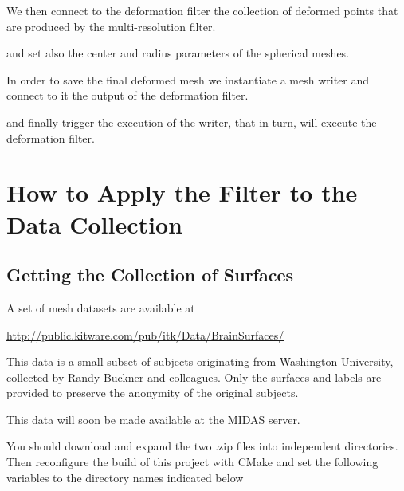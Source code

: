 \documentclass{InsightArticle}
\begin{document}
We then connect to the deformation filter the collection of deformed points that
are produced by the multi-resolution filter.

\begin{center}

\end{center}

and set also the center and radius parameters of the spherical meshes.

\begin{center}

\end{center}


In order to save the final deformed mesh we instantiate a mesh writer and
connect to it the output of the deformation filter.

\begin{center}

\end{center}

and finally trigger the execution of the writer, that in turn, will execute the
deformation filter.

\begin{center}

\end{center}


\section{How to Apply the Filter to the Data Collection}

\subsection{Getting the Collection of Surfaces}

A set of mesh datasets are available at

\url{http://public.kitware.com/pub/itk/Data/BrainSurfaces/}

This data is a small subset of subjects originating from Washington University,
collected by Randy Buckner and colleagues. Only the surfaces and labels are
provided to preserve the anonymity of the original subjects.

This data will soon be made available at the MIDAS server.

You should download and expand the two .zip files into independent directories.
Then reconfigure the build of this project with CMake and set the following
variables to the directory names indicated below
\end{document}
